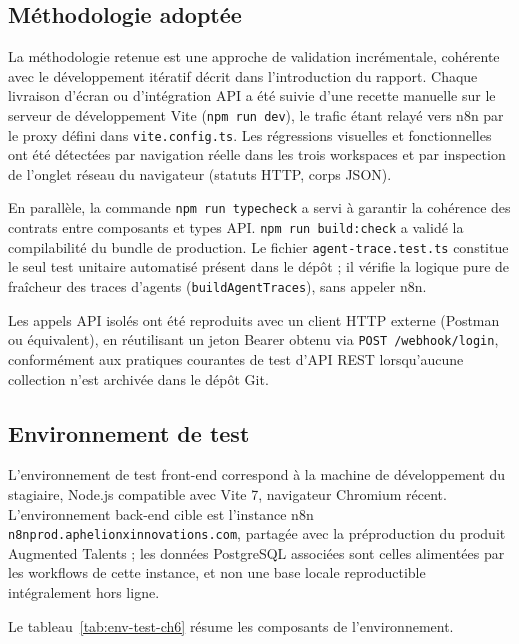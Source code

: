 \subsection{Méthodologie adoptée}

La méthodologie retenue est une approche de validation incrémentale, cohérente avec le développement itératif décrit dans l'introduction du rapport. Chaque livraison d'écran ou d'intégration API a été suivie d'une recette manuelle sur le serveur de développement Vite (\texttt{npm run dev}), le trafic étant relayé vers n8n par le proxy défini dans \texttt{vite.config.ts}. Les régressions visuelles et fonctionnelles ont été détectées par navigation réelle dans les trois workspaces et par inspection de l'onglet réseau du navigateur (statuts HTTP, corps JSON).

En parallèle, la commande \texttt{npm run typecheck} a servi à garantir la cohérence des contrats entre composants et types API. \texttt{npm run build:check} a validé la compilabilité du bundle de production. Le fichier \texttt{agent-trace.test.ts} constitue le seul test unitaire automatisé présent dans le dépôt ; il vérifie la logique pure de fraîcheur des traces d'agents (\texttt{buildAgentTraces}), sans appeler n8n.

Les appels API isolés ont été reproduits avec un client HTTP externe (Postman ou équivalent), en réutilisant un jeton Bearer obtenu via \texttt{POST /webhook/login}, conformément aux pratiques courantes de test d'API REST lorsqu'aucune collection n'est archivée dans le dépôt Git.

\subsection{Environnement de test}

L'environnement de test front-end correspond à la machine de développement du stagiaire, Node.js compatible avec Vite 7, navigateur Chromium récent. L'environnement back-end cible est l'instance n8n \texttt{n8nprod.aphelionxinnovations.com}, partagée avec la préproduction du produit Augmented Talents ; les données PostgreSQL associées sont celles alimentées par les workflows de cette instance, et non une base locale reproductible intégralement hors ligne.

Le tableau~\ref{tab:env-test-ch6} résume les composants de l'environnement.

